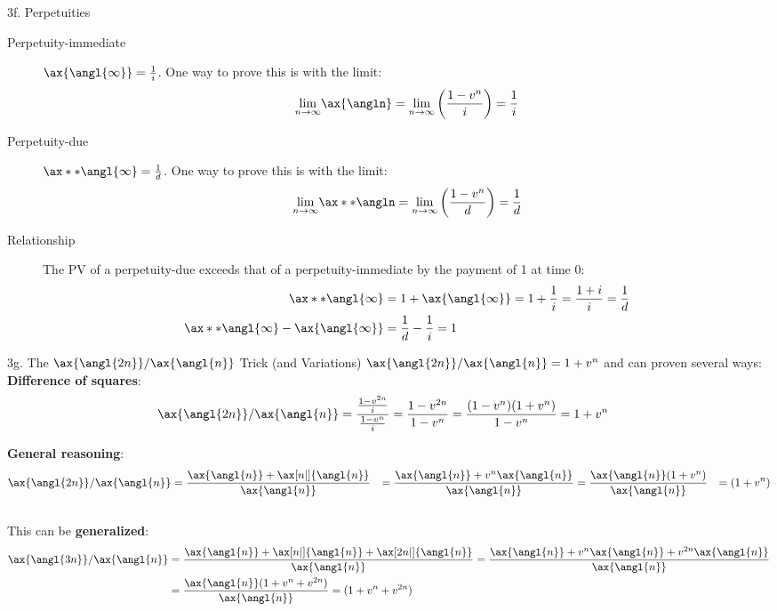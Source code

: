 \begin{CHPT_SUMM_AUTO}[label = {L.-3f}]{3f. Perpetuities}
\begin{description}
	\item[Perpetuity-immediate]	$\ax{\angl{\infty}}	=	\frac{1}{i}$.
		One way to prove this is with the limit:
		\begin{align*}
		\underset{n \rightarrow \infty}{\lim} \ax{\angln}
		=	\underset{n \rightarrow \infty}{\lim} \left( \frac{1 - v^{n}}{i} \right)
		=	\frac{1}{i}
		\end{align*}
	\item[Perpetuity-due]	$\ax**{\angl{\infty}}	=	\frac{1}{d}$.
		One way to prove this is with the limit:
		\begin{align*}
		\underset{n \rightarrow \infty}{\lim} \ax**{\angln}
		=	\underset{n \rightarrow \infty}{\lim} \left( \frac{1 - v^{n}}{d} \right)
		=	\frac{1}{d}
		\end{align*}
	\item[Relationship]	The PV of a perpetuity-due exceeds that of a perpetuity-immediate by the payment of 1 at time 0: 
		\begin{align*}
		\ax**{\angl{\infty}}	
		&=	1 + \ax{\angl{\infty}}	
		= 	1 + \frac{1}{i} 
		= 	\frac{1 + i}{i} 
		= 	\frac{1}{d}				\\
		\ax**{\angl{\infty}}	 - \ax{\angl{\infty}}	
		&=	\frac{1}{d} - \frac{1}{i} 
		=	1
		\end{align*}
\end{description}
\end{CHPT_SUMM_AUTO}

\begin{CHPT_SUMM_AUTO}[label = {L.-3g}]{3g. The $\ax{\angl{2n}} / \ax{\angl{n}}$ Trick (and Variations)}
$\ax{\angl{2n}} / \ax{\angl{n}} = 1 + v^{n}$ and can proven several ways:\\

\textbf{Difference of squares}:
\begin{align*}
	\ax{\angl{2n}} / \ax{\angl{n}}
	&=	\frac{\frac{1 - v^{2n}}{i}}{\frac{1 - v^{n}}{i}}
	=	\frac{1 - v^{2n}}{1 - v^{n}}
	=	\frac{(1 - v^{n})(1 + v^{n})}{1 - v^{n}}
	=	1 + v^{n}
\end{align*}

\textbf{General reasoning}:
\begin{align*}
	\ax{\angl{2n}} / \ax{\angl{n}}
	&=	\frac{\ax{\angl{n}} + \ax[n|]{\angl{n}}}{\ax{\angl{n}}}
	&=	\frac{\ax{\angl{n}} + v^{n} \ax{\angl{n}}}{\ax{\angl{n}}}
	&=	\frac{\ax{\angl{n}}(1 + v^{n})}{\ax{\angl{n}}}
	&=	(1 + v^{n})
\end{align*}\\

This can be \textbf{generalized}:
\begin{align*}
	\ax{\angl{3n}} / \ax{\angl{n}}
	&=	\frac{\ax{\angl{n}} + \ax[n|]{\angl{n}} + \ax[2n|]{\angl{n}}}{\ax{\angl{n}}}
	=	\frac{\ax{\angl{n}} + v^{n} \ax{\angl{n}} + v^{2n} \ax{\angl{n}}}{\ax{\angl{n}}}	\\
	&=	\frac{\ax{\angl{n}}(1 + v^{n} + v^{2n})}{\ax{\angl{n}}}
	=	(1 + v^{n} + v^{2n})
\end{align*}
\end{CHPT_SUMM_AUTO}

